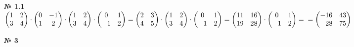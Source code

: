 \documentclass[a4paper, 12pt]{article}
\newenvironment{task}[1][0]{\vspace{.5cm} {\textbf{№ #1} \vspace{.5cm}\\ }}{}
\begin{document}
\begin{task}[1.1]
$
\begin{pmatrix}
	1 & 2\\
	3 & 4\\
\end{pmatrix} \cdot
\begin{pmatrix}
	0 & -1\\
	1 & 2\\
\end{pmatrix} \cdot
\begin{pmatrix}
	1 & 2\\
	3 & 4\\
\end{pmatrix} \cdot
\begin{pmatrix}
	0 & 1\\
	-1 & 2\\
\end{pmatrix}=
\begin{pmatrix}
	2 & 3\\
	4 & 5\\
\end{pmatrix} \cdot
\begin{pmatrix}
1 & 2\\
3 & 4\\
\end{pmatrix} \cdot
\begin{pmatrix}
0 & 1\\
-1 & 2\\
\end{pmatrix}=
\begin{pmatrix}
	11 & 16\\
	19 & 28\\
\end{pmatrix} \cdot
\begin{pmatrix}
	0 & 1\\
	-1 & 2\\
\end{pmatrix}=\\=
\begin{pmatrix}
	-16 & 43\\
	-28 & 75\\
\end{pmatrix}
$\\
\end{task}

\begin{task}[3]
	
\end{task}
\end{document}
